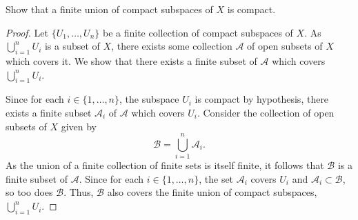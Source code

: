 \begin{exercise}[ID=3.26.3]
  Show that a finite union of compact subspaces of $X$ is compact.
\end{exercise}
%
\begin{solution}
  \begin{proof}
    Let $\{U_1, \ldots, U_n\}$ be a finite collection of compact subspaces of $X$.
    As $\bigcup_{i=1}^n U_i$ is a subset of $X$, there exists some collection $\mathcal{A}$ of open subsets of $X$ which covers it.
    We show that there exists a finite subset of $\mathcal{A}$ which covers $\bigcup_{i=1}^n U_i$.

    Since for each $i \in \{1, \ldots, n\}$, the subspace $U_i$ is compact by hypothesis, there exists a finite subset $\mathcal{A}_i$ of $\mathcal{A}$ which covers $U_i$.
    Consider the collection of open subsets of $X$ given by
    \begin{equation*}
      \mathcal{B} = \bigcup_{i=1}^n \mathcal{A}_i.
    \end{equation*}
    As the union of a finite collection of finite sets is itself finite, it follows that $\mathcal{B}$ is a finite subset of $\mathcal{A}$.
    Since for each $i \in \{1, \ldots, n\}$, the set $\mathcal{A}_i$ covers $U_i$ and $\mathcal{A}_i \subset \mathcal{B}$, so too does $\mathcal{B}$.
    Thus, $\mathcal{B}$ also covers the finite union of compact subspaces, $\bigcup_{i=1}^n U_i$.
  \end{proof}
\end{solution}
\newpage

